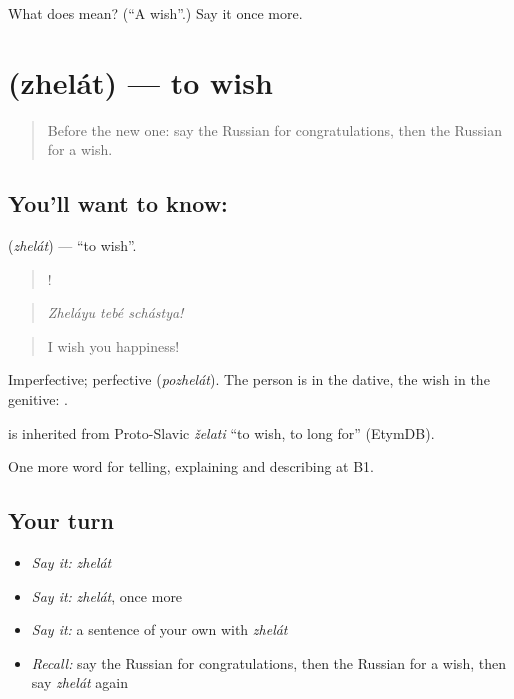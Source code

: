 \begin{tcolorbox}[breakable,colback=teal!4,colframe=teal!35!black,title={Before you move on}]
What does  mean? (\textquotedblleft{}A wish\textquotedblright{}.) Say it once more.
\end{tcolorbox}
\section[\texorpdfstring{\ru{желать} (zhelát)}{желать (zhelát)}]{ (zhelát) — to wish}

\label{lesson:RU-C312-zhelat}



\begin{quote}
Before the new one: say the Russian for congratulations, then the Russian for a wish.
\end{quote}

\subsection*{You'll want to know: }
\textbf{} (\emph{zhelát}) — \textquotedblleft{}to wish\textquotedblright{}.

\begin{quote}
  !
\end{quote}

\begin{quote}
\emph{Zheláyu tebé schástya!}
\end{quote}

\begin{quote}
I wish you happiness!
\end{quote}

Imperfective; perfective \emph{} (\emph{pozhelát}). The person is in the dative, the wish in the genitive: \emph{ }.

\begin{cousinweb}
\emph{} is inherited from Proto-Slavic \emph{želati} \textquotedblleft{}to wish, to long for\textquotedblright{} (EtymDB).
\end{cousinweb}

\begin{grammarlens}[title={What you've built}]
One more word for telling, explaining and describing at B1.
\end{grammarlens}

\subsection*{Your turn}
\begin{itemize}
\raggedright
  \item \emph{Say it:} \emph{zhelát}
  \item \emph{Say it:} \emph{zhelát}, once more
  \item \emph{Say it:} a sentence of your own with \emph{zhelát}
  \item \emph{Recall:} say the Russian for congratulations, then the Russian for a wish, then say \emph{zhelát} again
\end{itemize}

